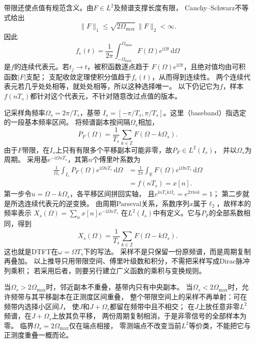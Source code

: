 带限还使点值有规范含义。由$F\in L^2$及频谱支撑长度有限，
Cauchy--Schwarz不等式给出
\[
  \|F\|_1\leq\sqrt{2\Omega_{\max}}\,\|F\|_2<\infty.
\]
因此
\[
  f_{\mathrm c}(t)=\frac1{2\pi}\int_{-\Omega_{\max}}^{\Omega_{\max}}
  F(\Omega)e^{\mathrm i\Omega t}\,\mathrm d\Omega
\]
是$f$的连续代表元。若$t_j\to t$，被积函数逐点趋于
$F(\Omega)e^{\mathrm i\Omega t}$，且绝对值均由可积函数$|F|$支配；
支配收敛定理使积分值趋于$f_{\mathrm c}(t)$，从而得到连续性。
两个连续代表元若几乎处处相等，就处处相等，所以这种选择唯一。
以下仍记它为$f$，样本$f(nT_s)$都针对这个代表元，不针对随意改过点值的版本。

记采样角频率$\Omega_s=2\pi/T_s$，基带
$I_s=[-\pi/T_s,\pi/T_s]$。这里（baseband）指选定的一段基本频率区间。
将频谱副本按间隔$\Omega_s$相加，
\[
  P_F(\Omega)=\frac1{T_s}\sum_{k\in\mathbb Z}F(\Omega-k\Omega_s).
\]
由于$F$带限，在$I_s$上只有有限多个平移副本可能非零，故$P_F\in L^2(I_s)$，
并以$\Omega_s$为周期。
采用基$e^{-\mathrm i\Omega nT_s}$，其第$n$个傅里叶系数为
\begin{align*}
  \frac1{\Omega_s}\int_{I_s}P_F(\Omega)e^{\mathrm i\Omega nT_s}\,\mathrm d\Omega
  &=\frac1{2\pi}\int_{\mathbb R}F(\Omega)e^{\mathrm i\Omega nT_s}\,\mathrm d\Omega\\
  &=f(nT_s)=x[n].
\end{align*}
第一步令$u=\Omega-k\Omega_s$，各平移区间拼回实轴，
且$e^{\mathrm inT_sk\Omega_s}=e^{2\pi\mathrm ink}=1$；
第二步就是所选连续代表元的逆变换。
由周期Parseval关系，系数序列$x$属于$\ell_2$，故样本的频率表示
$X_s(\Omega)=\sum_n x[n]e^{-\mathrm i\Omega nT_s}$
在$L^2(I_s)$中有定义。它与$P_F$的全部系数相同，得到
\begin{equation}
  X_s(\Omega)=\frac1{T_s}\sum_{k\in\mathbb Z}F(\Omega-k\Omega_s).
  \label{eq:signal-analysis-spectral-replication}
\end{equation}
这也就是DTFT在$\omega=\Omega T_s$下的写法。
采样不是只保留一份原频谱，而是周期复制再叠加。
以上推导只用带限空间、傅里叶级数和积分，不需把采样写成Dirac脉冲列乘积；
若采用后者，则要另行建立广义函数的乘积与变换规则。

当$\Omega_s>2\Omega_{\max}$时，邻近副本不重叠，基带内只有中央副本。
当$\Omega_s<2\Omega_{\max}$时，允许频带与其平移副本在正测度区间重叠，
整个带限空间上的采样不再单射：可在频带内选择小区间$J$，
使$J$和$J+\Omega_s$都留在频带中且不相交；
在$J$上放任意非零$L^2$频谱，在$J+\Omega_s$上放其负平移，
两份周期复制相消，于是非零信号的全部样本为零。
临界$\Omega_s=2\Omega_{\max}$仅在端点相接，
零测端点不改变当前$L^2$等价类，不能把它与正测度重叠一概而论。

